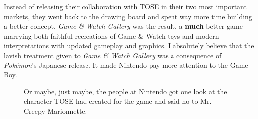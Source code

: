 \documentclass{book}
\begin{document}
Instead of releasing their collaboration with TOSE in their two most important markets, they went back to the drawing board and spent way more time building a better concept. \emph{Game \& Watch Gallery} was the result, a \textbf{much} better game marrying both faithful recreations of Game \& Watch toys and modern interpretations with updated gameplay and graphics. I absolutely believe that the lavish treatment given to \emph{Game \& Watch Gallery} was a consequence of \emph{Pokémon}’s Japanese release. It made Nintendo pay more attention to the Game Boy.\par
\FloatBarrier\vspace{\baselineskip}\begin{figure}[H]\caption*{Or maybe, just maybe, the people at Nintendo got one look at the character TOSE had created for the game and said no to Mr. Creepy Marionnette.}\end{figure}
\end{document}

